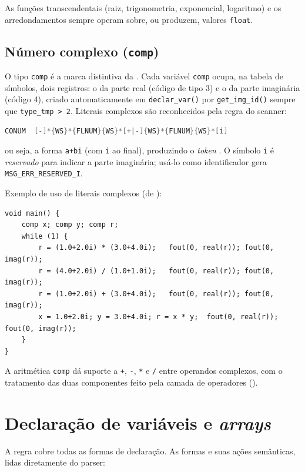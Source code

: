 As funções transcendentais (raiz, trigonometria, exponencial, logaritmo) e os
arredondamentos sempre operam sobre, ou produzem, valores \lstinline|float|.

\subsection{Número complexo (\texttt{comp})}

O tipo \lstinline|comp| é a marca distintiva da \cmm{}. Cada variável
\lstinline|comp| ocupa, na tabela de símbolos, dois registros: o da parte real
(código de tipo 3) e o da parte imaginária (código 4), criado automaticamente em
\lstinline|declar_var()| por \lstinline|get_img_id()| sempre que
\lstinline|type_tmp > 2|. Literais complexos são reconhecidos pela regra
 do scanner:

\begin{lstlisting}[language=C]
CONUM  [-]*{WS}*{FLNUM}{WS}*[+|-]{WS}*{FLNUM}{WS}*[i]
\end{lstlisting}

ou seja, a forma \lstinline|a+bi| (com \lstinline|i| ao final), produzindo o
\emph{token} . O símbolo \lstinline|i| é \emph{reservado} para indicar
a parte imaginária; usá-lo como identificador gera \lstinline|MSG_ERR_RESERVED_I|.

Exemplo de uso de literais complexos (de ):

\begin{lstlisting}[style=cmm]
void main() {
    comp x; comp y; comp r;
    while (1) {
        r = (1.0+2.0i) * (3.0+4.0i);   fout(0, real(r)); fout(0, imag(r));
        r = (4.0+2.0i) / (1.0+1.0i);   fout(0, real(r)); fout(0, imag(r));
        r = (1.0+2.0i) + (3.0+4.0i);   fout(0, real(r)); fout(0, imag(r));
        x = 1.0+2.0i; y = 3.0+4.0i; r = x * y;  fout(0, real(r)); fout(0, imag(r));
    }
}
\end{lstlisting}

A aritmética \lstinline|comp| dá suporte a \lstinline|+|, \lstinline|-|,
\lstinline|*| e \lstinline|/| entre operandos complexos, com o tratamento das
duas componentes feito pela camada de operadores ().

\section{Declaração de variáveis e \emph{arrays}}
\label{sec:cmm-declaracao}

A regra  cobre todas as formas de declaração. As formas e suas ações
semânticas, lidas diretamente do parser:

